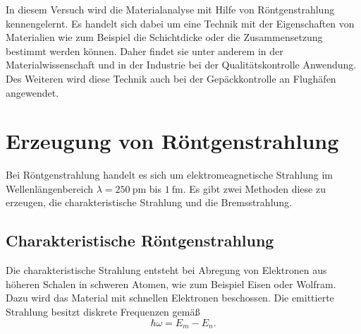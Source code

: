 In diesem Versuch wird die Materialanalyse mit Hilfe von Röntgenstrahlung kennengelernt. Es handelt sich dabei um eine Technik mit der Eigenschaften von Materialien wie zum Beispiel die Schichtdicke oder die Zusammensetzung bestimmt werden können. Daher findet sie unter anderem in der Materialwissenschaft und in der Industrie bei der Qualitätskontrolle Anwendung.
Des Weiteren wird diese Technik auch bei der Gepäckkontrolle an Flughäfen angewendet.

\section{Erzeugung von Röntgenstrahlung}

Bei Röntgenstrahlung handelt es sich um elektromeagnetische Strahlung im Wellenlängenbereich $\lambda=\SI{250}{\pico\metre}$ bis $\SI{1}{\femto\metre}$. Es gibt zwei Methoden diese zu erzeugen, die charakteristische Strahlung und die Bremsstrahlung.

\subsection{Charakteristische Röntgenstrahlung}

Die charakteristische Strahlung entsteht bei Abregung von Elektronen aus höheren Schalen in schweren Atomen, wie zum Beispiel Eisen oder Wolfram. Dazu wird das Material mit schnellen Elektronen beschossen.
Die emittierte Strahlung besitzt diskrete Frequenzen gemäß
\begin{equation}
 \hbar\omega = E_{m}-E_{n}.
\end{equation}
